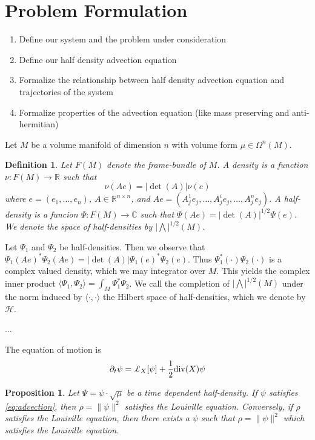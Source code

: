 \documentclass[12pt]{amsart}
\title{}
\author{}
\date{} %
\newtheorem{definition}{Definition}
\newtheorem{prop}{Proposition}
\begin{document}
\section{Problem Formulation}\label{sec:Formulation}

\begin{enumerate}
	\item Define our system and the problem under consideration
	\item Define our half density advection equation
	\item Formalize the relationship between half density advection equation and trajectories of the system
	\item Formalize properties of the advection equation (like mass preserving and anti-hermitian)
\end{enumerate}

Let $M$ be a volume manifold of dimension $n$ with volume form $\mu \in \Omega^n(M)$.
\begin{definition}
	Let $F(M)$ denote the frame-bundle of $M$.  A density is a function $\nu : F(M) \to \mathbb{R}$ such that
	\[
		\nu( Ae) = |\det(A)| \nu(e)	
	\]
	where $e = (e_1, \dots , e_n)$, $A \in \mathbb{R}^{n \times n}$, and $A e = (A^1_j e_j , \dots , A^i_j e_j , \dots , A^n_j e_j )$.
	A \emph{half-density} is a funcion $\Psi: F(M) \to \mathbb{C}$ such that $\Psi(Ae) = |\det(A)|^{1/2} \Psi(e)$.
	We denote the space of half-densities by $| \bigwedge |^{1/2}(M)$.
\end{definition}
  Let $\Psi_1$ and $\Psi_2$ be half-densities.  Then we observe that $\Psi_1(Ae)^{\ast} \Psi_2(Ae) = | \det(A) | \Psi_1(e)^{\ast} \Psi_2(e)$.
  Thus $\Psi_1^{\ast}( \cdot) \Psi_2(\cdot)$ is a complex valued density, which we may integrator over $M$.
  This yields the complex inner product $\langle \Psi_1 , \Psi_2 \rangle = \int_M \Psi_1^{\ast} \Psi_2$.
  We call the completion of $| \bigwedge |^{1/2}(M)$ under the norm induced by $\langle \cdot , \cdot \rangle$ the Hilbert space of half-densities, which we denote by $\mathcal{H}$.
 
  ...
 
 The equation of motion is
 \begin{align}
 	\partial_t \psi = \pounds_{X}[\psi] + \frac{1}{2} {\rm div}(X) \psi \label{eq:advection}
 \end{align}
 
  \begin{prop}
  	Let $\Psi = \psi \cdot \sqrt{\mu}$ be a time dependent half-density.  If $\psi$ satisfies \eqref{eq:advection}, then $\rho = \| \psi \|^2$ satisfies the Louiville equation.  Conversely, if $\rho$ satisfies the Louiville equation, then there exists a $\psi$ such that $\rho = \| \psi \|^2$ which satisfies the Louiville equation.
  \end{prop}
  
\end{document}

